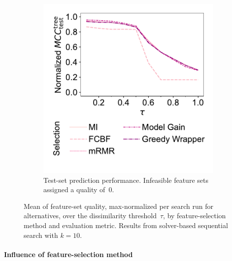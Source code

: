 \documentclass{article}
\theoremstyle{definition}
\begin{document}
\begin{figure}[p]
\begin{subfigure}[t]{0.48\textwidth}
		\includegraphics[width=\textwidth, trim=20 35 15 15, clip]{plots/afs-impact-tau-fs-method-decision-tree-test-mcc-max-fillna.pdf}
		\caption{
			Test-set prediction performance.
			Infeasible feature sets assigned a quality of~0.
		}
		\label{fig:afs:impact-tau-fs-method-decision-tree-test-mcc-max-fillna}
	\end{subfigure}
	\caption{
		Mean of feature-set quality, max-normalized per search run for alternatives, over the dissimilarity threshold~$\tau$, by feature-selection method and evaluation metric.
		Results from solver-based sequential search with $k=10$.
	}
	\label{fig:afs:impact-tau-fs-method-quality}
\end{figure}

\paragraph{Influence of feature-selection method}
\end{document}
